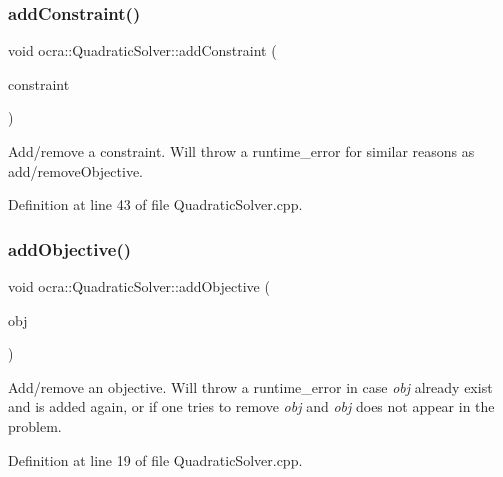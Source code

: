 \hypertarget{classocra_1_1QuadraticSolver_a0cf6c866db56031b48a447aa310bad94}{}\label{classocra_1_1QuadraticSolver_a0cf6c866db56031b48a447aa310bad94} 
\subsubsection{\texorpdfstring{add\+Constraint()}{addConstraint()}}
{\footnotesize\ttfamily void ocra\+::\+Quadratic\+Solver\+::add\+Constraint (\begin{DoxyParamCaption}\item[{\hyperlink{namespaceocra_ae8b87cf4099be3efc3b410019ad2046e}{Linear\+Constraint} \&}]{constraint }\end{DoxyParamCaption})}

Add/remove a constraint. Will throw a runtime\+\_\+error for similar reasons as add/remove\+Objective. 

Definition at line 43 of file Quadratic\+Solver.\+cpp.

\hypertarget{classocra_1_1QuadraticSolver_af8e4dba5faceb48ae3c355bd7fcf7073}{}\label{classocra_1_1QuadraticSolver_af8e4dba5faceb48ae3c355bd7fcf7073} 
\subsubsection{\texorpdfstring{add\+Objective()}{addObjective()}}
{\footnotesize\ttfamily void ocra\+::\+Quadratic\+Solver\+::add\+Objective (\begin{DoxyParamCaption}\item[{\hyperlink{namespaceocra_a0b50673710f087c0f1733aefd1a8e0f7}{Quadratic\+Objective} \&}]{obj }\end{DoxyParamCaption})}

Add/remove an objective. Will throw a runtime\+\_\+error in case {\itshape obj} already exist and is added again, or if one tries to remove {\itshape obj} and {\itshape obj} does not appear in the problem. 

Definition at line 19 of file Quadratic\+Solver.\+cpp.

\hypertarget{classocra_1_1QuadraticSolver_ab95c9570c859ca0d1ff2ea5f1c6efd44}{}\label{classocra_1_1QuadraticSolver_ab95c9570c859ca0d1ff2ea5f1c6efd44} 
